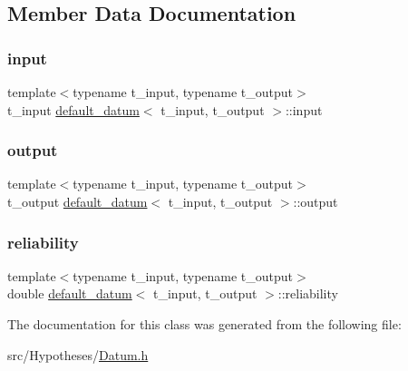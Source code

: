 \subsection{Member Data Documentation}
\mbox{\label{classdefault__datum_a19f8427ac058ad008f5b2541e17d42e7}} 
\subsubsection{\texorpdfstring{input}{input}}
{\footnotesize\ttfamily template$<$typename t\+\_\+input, typename t\+\_\+output$>$ \\
t\+\_\+input \hyperlink{classdefault__datum}{default\+\_\+datum}$<$ t\+\_\+input, t\+\_\+output $>$\+::input}

\mbox{\label{classdefault__datum_afafbe2c709ff57daca0fd60289bdd13a}} 
\subsubsection{\texorpdfstring{output}{output}}
{\footnotesize\ttfamily template$<$typename t\+\_\+input, typename t\+\_\+output$>$ \\
t\+\_\+output \hyperlink{classdefault__datum}{default\+\_\+datum}$<$ t\+\_\+input, t\+\_\+output $>$\+::output}

\mbox{\label{classdefault__datum_ad9d6b81d35ca8107e8c810186cef9270}} 
\subsubsection{\texorpdfstring{reliability}{reliability}}
{\footnotesize\ttfamily template$<$typename t\+\_\+input, typename t\+\_\+output$>$ \\
double \hyperlink{classdefault__datum}{default\+\_\+datum}$<$ t\+\_\+input, t\+\_\+output $>$\+::reliability}



The documentation for this class was generated from the following file\+:\begin{DoxyCompactItemize}
\item 
src/\+Hypotheses/\hyperlink{_datum_8h}{Datum.\+h}\end{DoxyCompactItemize}
